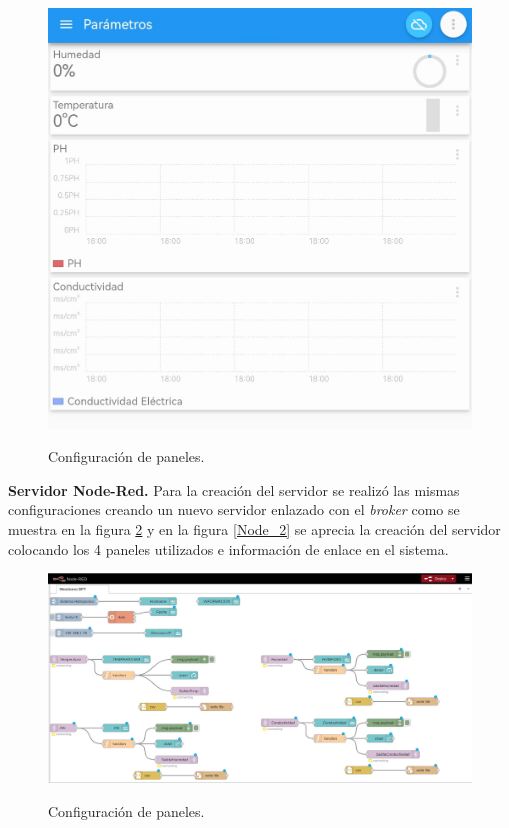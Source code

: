 \begin{figure}[H]
\centering
         \includegraphics[scale=0.45]{imgs/APP_4.png} \\
    \caption{Configuración de paneles.}\label{app_3}
\end{figure}

\textbf{Servidor Node-Red.} Para la creación del servidor se realizó las mismas configuraciones creando un nuevo servidor enlazado con el \textit{broker} como se muestra en la figura \ref{Node_1} y en la figura \ref{Node_2} se aprecia la creación del servidor colocando los 4 paneles utilizados e información de enlace en el sistema.

\begin{figure}[H]
\centering
         \includegraphics[scale=0.5]{imgs/NODE-RED.png} \\
    \caption{Configuración de paneles.}\label{Node_1}
\end{figure}

